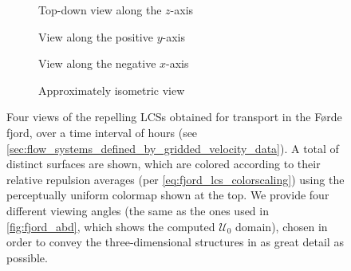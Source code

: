 \begin{figure}[htpb]
    \centering
    \vspace{5.0pt}

    \hspace*{\fill}
    \begin{subfigure}[b]{0.425\textwidth}
        \centering
        \caption[]{{\small Top-down view along the $z$-axis}}
        \label{fig:fjord_lcss_z}
    \end{subfigure}\hfill%
    \begin{subfigure}[b]{0.425\textwidth}
        \centering
        \caption[]{{\small View along the positive $y$-axis}}
        \label{fig:fjord_lcss_y}
    \end{subfigure}
    \hspace*{\fill}

    \hspace*{\fill}
    \begin{subfigure}[b]{0.425\textwidth}
        \centering
        \caption[]{{\small View along the negative $x$-axis}}
        \label{fig:fjord_lcss_x}
    \end{subfigure}\hfill%
    \begin{subfigure}[b]{0.425\textwidth}
        \centering
        \caption[]{{\small Approximately isometric view}}
        \label{fig:fjord_lcss_isometric}
    \end{subfigure}%
    \hspace*{\fill}
    \caption[Four views of the repelling LCSs obtained for transport in the
    Førde fjord]
    {
        Four views of the repelling LCSs obtained for transport in the Førde
        fjord, over a time interval of  hours (see
        \cref{sec:flow_systems_defined_by_gridded_velocity_data}). A total
        of  distinct surfaces are shown, which are colored
        according to their relative repulsion averages (per
        \cref{eq:fjord_lcs_colorscaling}) using the perceptually uniform
        colormap shown at the top. We provide four different viewing angles
        (the same as the ones used in \cref{fig:fjord_abd}, which shows
        the computed $\mathcal{U}_{0}$ domain), chosen in order to convey
        the three-dimensional structures in as great detail as possible.
}
    \label{fig:fjord_lcss}
\end{figure}

